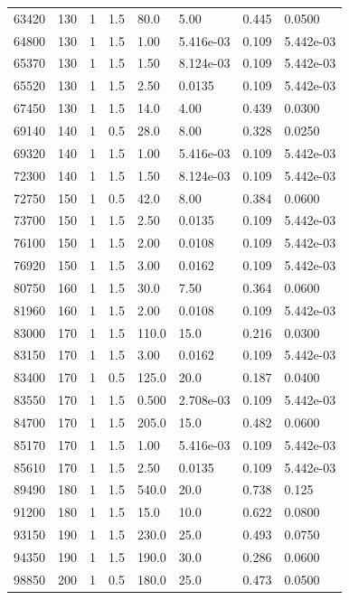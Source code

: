 \documentclass[preview]{standalone}
\begin{document}
{{{\begin{tabular}{L{1.2cm}C{1.2cm} C{0.3cm}C{0.5cm} C{1.4cm}C{1.4cm} C{1.4cm}C{1.4cm}}
  63420  &   130  & 1     & 1.5 &  80.0  & 5.00  & 0.445 &  0.0500   \\ 
  64800  &   130  & 1     & 1.5 &  1.00  & 5.416e-03  & 0.109 &  5.442e-03   \\ 
  65370  &   130  & 1     & 1.5 &  1.50  & 8.124e-03  & 0.109 &  5.442e-03   \\ 
  65520  &   130  & 1     & 1.5 &  2.50  & 0.0135  & 0.109 &  5.442e-03   \\ 
  67450  &   130  & 1     & 1.5 &  14.0  & 4.00  & 0.439 &  0.0300   \\ 
  69140  &   140  & 1     & 0.5 &  28.0  & 8.00  & 0.328 &  0.0250   \\ 
  69320  &   140  & 1     & 1.5 &  1.00  & 5.416e-03  & 0.109 &  5.442e-03   \\ 
  72300  &   140  & 1     & 1.5 &  1.50  & 8.124e-03  & 0.109 &  5.442e-03   \\ 
  72750  &   150  & 1     & 0.5 &  42.0  & 8.00  & 0.384 &  0.0600   \\ 
  73700  &   150  & 1     & 1.5 &  2.50  & 0.0135  & 0.109 &  5.442e-03   \\ 
  76100  &   150  & 1     & 1.5 &  2.00  & 0.0108  & 0.109 &  5.442e-03   \\ 
  76920  &   150  & 1     & 1.5 &  3.00  & 0.0162  & 0.109 &  5.442e-03   \\ 
  80750  &   160  & 1     & 1.5 &  30.0  & 7.50  & 0.364 &  0.0600   \\ 
  81960  &   160  & 1     & 1.5 &  2.00  & 0.0108  & 0.109 &  5.442e-03   \\ 
  83000  &   170  & 1     & 1.5 &  110.0  & 15.0  & 0.216 &  0.0300   \\ 
  83150  &   170  & 1     & 1.5 &  3.00  & 0.0162  & 0.109 &  5.442e-03   \\ 
  83400  &   170  & 1     & 0.5 &  125.0  & 20.0  & 0.187 &  0.0400   \\ 
  83550  &   170  & 1     & 1.5 &  0.500  & 2.708e-03  & 0.109 &  5.442e-03   \\ 
  84700  &   170  & 1     & 1.5 &  205.0  & 15.0  & 0.482 &  0.0600   \\ 
  85170  &   170  & 1     & 1.5 &  1.00  & 5.416e-03  & 0.109 &  5.442e-03   \\ 
  85610  &   170  & 1     & 1.5 &  2.50  & 0.0135  & 0.109 &  5.442e-03   \\ 
  89490  &   180  & 1     & 1.5 &  540.0  & 20.0  & 0.738 &  0.125   \\ 
  91200  &   180  & 1     & 1.5 &  15.0  & 10.0  & 0.622 &  0.0800   \\ 
  93150  &   190  & 1     & 1.5 &  230.0  & 25.0  & 0.493 &  0.0750   \\ 
  94350  &   190  & 1     & 1.5 &  190.0  & 30.0  & 0.286 &  0.0600   \\ 
  98850  &   200  & 1     & 0.5 &  180.0  & 25.0  & 0.473 &  0.0500   \\ 
\hline 
\end{tabular} 

}}}
\end{document}
